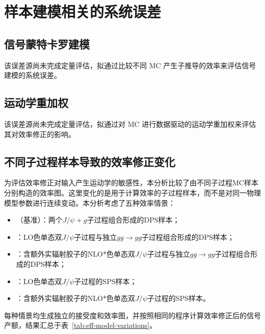 \section{样本建模相关的系统误差}
\label{sec:syst-sample-modeling}

\subsection{信号蒙特卡罗建模}
\label{subsec:syst-signal-mc-modeling}

该误差源尚未完成定量评估，拟通过比较不同 MC 产生子推导的效率来评估信号建模的系统误差。

\subsection{运动学重加权}
\label{subsec:syst-kinematic-reweighting}

该误差源尚未完成定量评估，拟通过对 MC 进行数据驱动的运动学重加权来评估其对效率修正的影响。

\subsection{不同子过程样本导致的效率修正变化}
\label{subsec:syst-model-dependence}

为评估效率修正对输入产生运动学的敏感性，本分析比较了由不同子过程MC样本分别构造的效率图。这里变化的是用于计算效率的子过程样本，而不是对同一物理模型参数进行连续变动。本分析考虑了五种效率情景：
\begin{itemize}
  \item \DPSone（基准）：两个$J/\psi+g$子过程组合形成的DPS样本；
  \item \DPStwoLO：LO色单态双$J/\psi$子过程与独立$gg\to gg$子过程组合形成的DPS样本；
  \item \DPStwoNLO：含额外实辐射胶子的NLO*色单态双$J/\psi$子过程与独立$gg\to gg$子过程组合形成的DPS样本；
  \item \SPSLO：LO色单态双$J/\psi$子过程的SPS样本；
  \item \SPSNLO：含额外实辐射胶子的NLO*色单态双$J/\psi$子过程的SPS样本。
\end{itemize}
每种情景均生成独立的接受度和效率图，并按照相同的程序计算效率修正后的信号产额，结果汇总于表~\ref{tab:eff-model-variations}。

